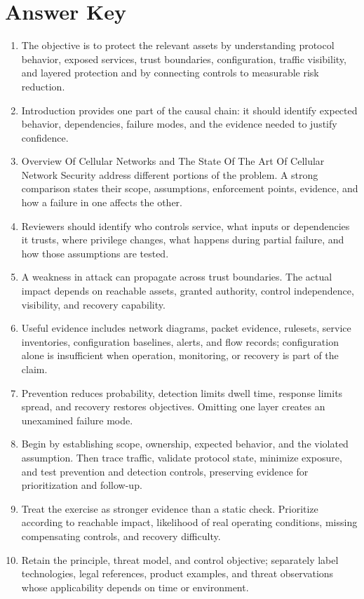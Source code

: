 \documentclass[11pt]{article}
\begin{document}
\section*{Answer Key}
\begin{enumerate}
\item The objective is to protect the relevant assets by understanding protocol behavior, exposed services, trust boundaries, configuration, traffic visibility, and layered protection and by connecting controls to measurable risk reduction.
\item Introduction provides one part of the causal chain: it should identify expected behavior, dependencies, failure modes, and the evidence needed to justify confidence.
\item Overview Of Cellular Networks and The State Of The Art Of Cellular Network Security address different portions of the problem. A strong comparison states their scope, assumptions, enforcement points, evidence, and how a failure in one affects the other.
\item Reviewers should identify who controls service, what inputs or dependencies it trusts, where privilege changes, what happens during partial failure, and how those assumptions are tested.
\item A weakness in attack can propagate across trust boundaries. The actual impact depends on reachable assets, granted authority, control independence, visibility, and recovery capability.
\item Useful evidence includes network diagrams, packet evidence, rulesets, service inventories, configuration baselines, alerts, and flow records; configuration alone is insufficient when operation, monitoring, or recovery is part of the claim.
\item Prevention reduces probability, detection limits dwell time, response limits spread, and recovery restores objectives. Omitting one layer creates an unexamined failure mode.
\item Begin by establishing scope, ownership, expected behavior, and the violated assumption. Then trace traffic, validate protocol state, minimize exposure, and test prevention and detection controls, preserving evidence for prioritization and follow-up.
\item Treat the exercise as stronger evidence than a static check. Prioritize according to reachable impact, likelihood of real operating conditions, missing compensating controls, and recovery difficulty.
\item Retain the principle, threat model, and control objective; separately label technologies, legal references, product examples, and threat observations whose applicability depends on time or environment.
\end{enumerate}
\end{document}
